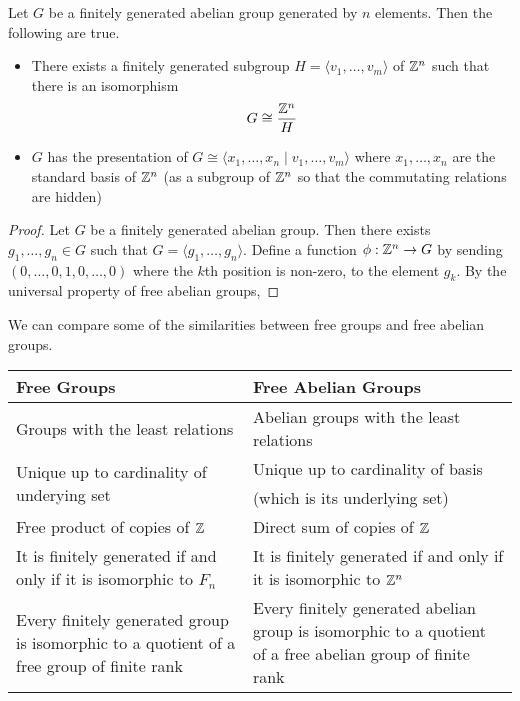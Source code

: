 \documentclass[a4paper]{article}
\begin{document}
\begin{prp}{}{} Let $G$ be a finitely generated abelian group generated by $n$ elements. Then the following are true. 
\begin{itemize}
\item There exists a finitely generated subgroup $H=\langle v_1,\dots,v_m\rangle$ of $\mathbb{Z}^n$ such that there is an isomorphism $$G\cong\frac{\mathbb{Z}^n}{H}$$
\item $G$ has the presentation of $G\cong\langle x_1,\dots,x_n\;|\;v_1,\dots,v_m\rangle$ where $x_1,\dots,x_n$ are the standard basis of $\mathbb{Z}^n$ (as a subgroup of $\mathbb{Z}^n$ so that the commutating relations are hidden)
\end{itemize} \tcbline
\begin{proof}
Let $G$ be a finitely generated abelian group. Then there exists $g_1,\dots,g_n\in G$ such that $G=\langle g_1,\dots,g_n\rangle$. Define a function $\phi:\mathbb{Z}^n\to G$ by sending $(0,\dots,0,1,0,\dots,0)$ where the $k$th position is non-zero, to the element $g_k$. By the universal property of free abelian groups, 
\end{proof}
\end{prp}

We can compare some of the similarities between free groups and free abelian groups. 

\begin{table}[!ht]
\centering
\begin{tabular}{p{8cm}|p{8cm}}
Free Groups                                                                               & Free Abelian Groups                                                                                       \\[1.5ex] \hline\hline
Groups with the least relations                                                           & Abelian groups with the least relations                                                                   \\[1.5ex]\hline
\multirow{2}{*}{Unique up to cardinality of underying set}                                & Unique up to cardinality of basis                                                                         \\
                                                                                          & (which is its underlying set)                                                                             \\\hline
Free product of copies of $\mathbb{Z}$                                                         & Direct sum of copies of $\mathbb{Z}$                                                                              \\[1.5ex]\hline
It is finitely generated if and only if it is isomorphic to $F_n$                         & It is finitely generated if and only if it is isomorphic to $\mathbb{Z}^n$                                        \\[1.5ex]\hline
Every finitely generated group is isomorphic to a quotient of a free group of finite rank & Every finitely generated abelian group is isomorphic to a quotient of a free abelian group of finite rank
\end{tabular}
\end{table}
\end{document}

